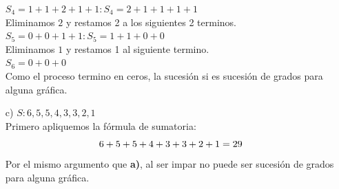 \documentclass{article}
\begin{document}
\begin{justify}
\begin{enumerate}[label=\alph*)]
{        $S_4 = 1+1+2+1+1 : S_4 = 2+1+1+1+1 $\\
        Eliminamos $2$ y restamos 2 a los siguientes 2 terminos. \\
        $S_5 = 0+0+1+1 : S_5 = 1+1+0+0$ \\
        Eliminamos $1$ y restamos 1 al siguiente termino. \\
        $S_6 = 0+0+0$ \\
        Como el proceso termino en ceros, la sucesión si es sucesión de grados para alguna gráfica. \\
      }
    \item[c)] $S : 6, 5, 5, 4, 3, 3, 2, 1 $\\
      Primero apliquemos la fórmula de sumatoria: \\
      \begin{equation}
        6+5+5+4+3+3+2+1 = 29 \\
      \end{equation}
      Por el mismo argumento que \textbf{a)}, al ser impar no puede ser sucesión de grados para alguna gráfica. \\
    \end{enumerate}
    
  \end{justify}
\end{document}
